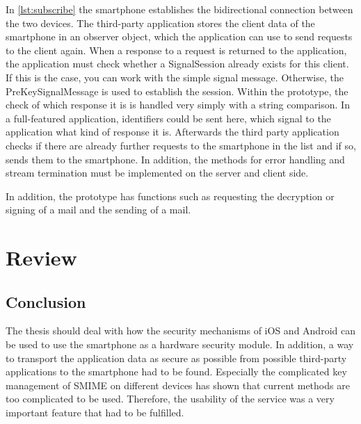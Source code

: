 \documentclass[12pt,oneside,a4paper,parskip]{scrbook}
\begin{document}
\newpage
In \ref{lst:subscribe} the smartphone establishes the bidirectional connection between the two devices. The third-party application stores the client data of the smartphone in an observer object, which the application can use to send requests to the client again. When a response to a request is returned to the application, the application must check whether a SignalSession already exists for this client. If this is the case, you can work with the simple signal message. Otherwise, the PreKeySignalMessage is used to establish the session. Within the prototype, the check of which response it is is handled very simply with a string comparison. In a full-featured application, identifiers could be sent here, which signal to the application what kind of response it is. Afterwards the third party application checks if there are already further requests to the smartphone in the list and if so, sends them to the smartphone. In addition, the methods for error handling and stream termination must be implemented on the server and client side.

In addition, the prototype has functions such as requesting the decryption or signing of a mail and the sending of a mail.






\chapter{Review}
\section{Conclusion}
The thesis should deal with how the security mechanisms of iOS and Android can be used to use the smartphone as a hardware security module. In addition, a way to transport the application data as secure as possible from possible third-party applications to the smartphone had to be found. Especially the complicated key management of SMIME on different devices has shown that current methods are too complicated to be used. Therefore, the usability of the service was a very important feature that had to be fulfilled.
\end{document}
